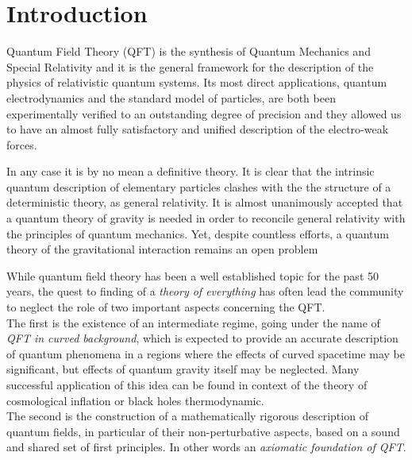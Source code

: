\documentclass[Main]{subfiles}
\begin{document}
\chapter*{Introduction}


Quantum Field Theory (QFT)  is the synthesis of Quantum Mechanics and Special Relativity and it is the general framework for the description of the physics of relativistic quantum systems.
Its most direct applications, quantum electrodynamics and the standard model of particles, are both been experimentally verified to an outstanding degree of precision and they allowed us to have an almost fully satisfactory and unified description of the electro-weak forces.

In any case it is by no mean a definitive theory. It is clear that the intrinsic quantum description of elementary particles clashes with the the structure of a deterministic theory, as general relativity. 
It is almost unanimously accepted that a quantum theory of gravity is needed in order to reconcile general relativity with the principles of quantum mechanics. Yet, despite countless efforts, a quantum theory of the gravitational interaction remains an open problem

While quantum field theory has been a well established topic for the past 50 years, the quest to finding of a \emph{theory of everything} has often lead the community to neglect the role of two important aspects concerning the QFT.\\
The first is the existence of an intermediate regime, going under the name of \emph{QFT in curved background}, which is expected to provide an accurate description of quantum phenomena in a regions where the effects of curved spacetime may be significant, but effects of quantum gravity itself may be neglected. 
Many successful application of this idea can be found in context of the theory of cosmological inflation or black holes thermodynamic.\\
The second is the construction of a mathematically rigorous description of quantum fields, in particular of their non-perturbative aspects,  based on a sound and shared set of first principles. In other words an \emph{axiomatic foundation of QFT}.
\end{document}
